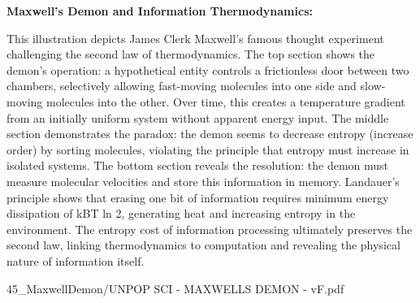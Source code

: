 \begin{SideNotePage}{
  \textbf{Maxwell's Demon and Information Thermodynamics:} \par
  This illustration depicts James Clerk Maxwell's famous thought experiment challenging the second law of thermodynamics. The top section shows the demon's operation: a hypothetical entity controls a frictionless door between two chambers, selectively allowing fast-moving molecules into one side and slow-moving molecules into the other. Over time, this creates a temperature gradient from an initially uniform system without apparent energy input. The middle section demonstrates the paradox: the demon seems to decrease entropy (increase order) by sorting molecules, violating the principle that entropy must increase in isolated systems. The bottom section reveals the resolution: the demon must measure molecular velocities and store this information in memory. Landauer's principle shows that erasing one bit of information requires minimum energy dissipation of kBT ln 2, generating heat and increasing entropy in the environment. The entropy cost of information processing ultimately preserves the second law, linking thermodynamics to computation and revealing the physical nature of information itself.
}{45_MaxwellDemon/UNPOP SCI - MAXWELLS DEMON - vF.pdf}
\end{SideNotePage}


